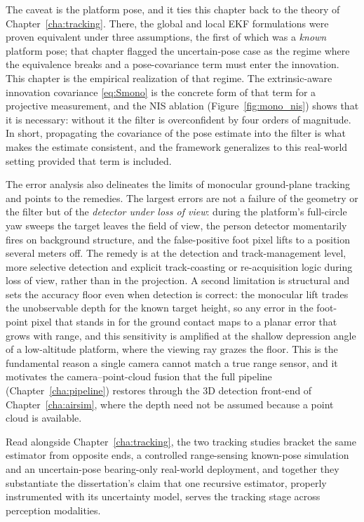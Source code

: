 The caveat is the platform pose, and it ties this chapter back to the theory of
Chapter~\ref{cha:tracking}. There, the global and local EKF formulations were
proven equivalent under three assumptions, the first of which was a \emph{known}
platform pose; that chapter flagged the uncertain-pose case as the regime where
the equivalence breaks and a pose-covariance term must enter the innovation. This
chapter is the empirical realization of that regime. The extrinsic-aware
innovation covariance \eqref{eq:Smono} is the concrete form of that term for a
projective measurement, and the NIS ablation (Figure~\ref{fig:mono_nis}) shows
that it is necessary: without it the filter is overconfident by four orders of
magnitude. In short, propagating the covariance of the pose estimate into the
filter is what makes the estimate consistent, and the framework generalizes to
this real-world setting provided that term is included.

The error analysis also delineates the limits of monocular ground-plane tracking
and points to the remedies. The largest errors are not a failure of the geometry
or the filter but of the \emph{detector under loss of view}: during the platform's
full-circle yaw sweeps the target leaves the field of view, the person detector
momentarily fires on background structure, and the false-positive foot pixel lifts
to a position several meters off. The remedy is at the detection and
track-management level, more selective detection and explicit track-coasting or
re-acquisition logic during loss of view, rather than in the projection. A second
limitation is structural and sets the accuracy floor even when detection is
correct: the monocular lift trades the unobservable depth for the known target
height, so any error in the foot-point pixel that stands in for the ground contact
maps to a planar error that grows with range, and this sensitivity is amplified at
the shallow depression angle of a low-altitude platform, where the viewing ray
grazes the floor. This is the fundamental reason a single camera cannot match a
true range sensor, and it motivates the camera--point-cloud fusion that the full
pipeline (Chapter~\ref{cha:pipeline}) restores through the 3D detection front-end
of Chapter~\ref{cha:airsim}, where the depth need not be assumed because a point
cloud is available.

Read alongside Chapter~\ref{cha:tracking}, the two tracking studies bracket the
same estimator from opposite ends, a controlled range-sensing known-pose
simulation and an uncertain-pose bearing-only real-world deployment, and together
they substantiate the dissertation's claim that one recursive estimator, properly
instrumented with its uncertainty model, serves the tracking stage across
perception modalities.

